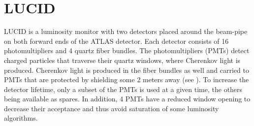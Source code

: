 %    
%   
%  
% 

\section{LUCID}
LUCID is a luminosity monitor with two detectors placed around the beam-pipe on both forward ends of the ATLAS detector. 
Each detector consists of 16 photomultipliers and 4 quartz fiber bundles. The photomultipliers (PMTs) detect charged 
particles that traverse their quartz windows, where Cherenkov light is produced. Cherenkov light is produced in 
the fiber bundles as well and carried to PMTs that are protected by shielding some 2 meters away 
(see ). To increase the detector lifetime, only a subset of the PMTs is used at a 
given time, the others being available as spares. In addition, 4 PMTs have a reduced window opening to decrease 
their acceptance and thus avoid saturation of some luminosity algorithms.


